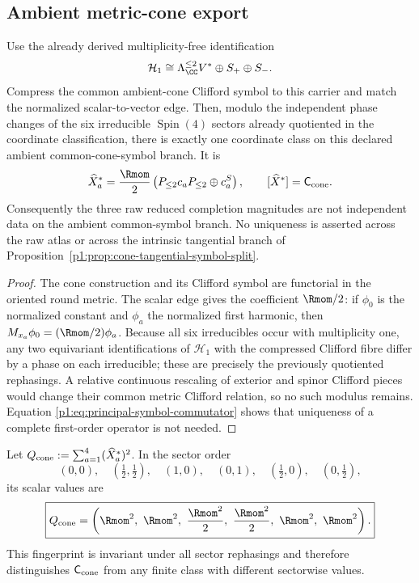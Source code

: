 \documentclass[11pt]{article}
\begin{document}
\subsection{Ambient metric-cone export}

\begin{theorem}
\label{p1:thm:metric-cone-clifford-coordinate-class}
\leavevmode\par
Use the already derived multiplicity-free identification
\[
 \mathcal H_1\cong
 \Lambda^{\le2}_{\CC}V^*\oplus S_+\oplus S_-.
\]
Compress the common ambient-cone Clifford symbol to this carrier and match the
normalized scalar-to-vector edge.  Then, modulo the independent phase changes
of the six irreducible $\operatorname{Spin}(4)$ sectors already quotiented in the coordinate
classification, there is exactly one coordinate class on this declared
ambient common-cone-symbol branch.  It is
\[
 \widehat X_a^*
 =\frac{\Rmom}{2}\left(P_{\le2}c_aP_{\le2}\oplus c_a^S\right),
 \qquad [\widehat X^*]=\mathsf C_{\rm cone}.
\]
Consequently the three raw reduced completion magnitudes are not independent
data on the ambient common-symbol branch.  No uniqueness is asserted across
the raw atlas or across the intrinsic tangential branch of
Proposition~\ref{p1:prop:cone-tangential-symbol-split}.
\end{theorem}

\begin{proof}
The cone construction and its Clifford symbol are functorial in the oriented
round metric.  The scalar edge gives the coefficient $\Rmom/2$: if $\phi_0$ is
the normalized constant and $\phi_a$ the normalized first harmonic, then
$M_{x_a}\phi_0=(\Rmom/2)\phi_a$.  Because all six irreducibles occur with
multiplicity one, any two equivariant identifications of $\mathcal H_1$ with
the compressed Clifford fibre differ by a phase on each irreducible; these are
precisely the previously quotiented rephasings.  A relative continuous
rescaling of exterior and spinor Clifford pieces would change their common
metric Clifford relation, so no such modulus remains.  Equation
\eqref{p1:eq:principal-symbol-commutator} shows that uniqueness of a complete
first-order operator is not needed.
\end{proof}

\begin{corollary}
\label{p1:cor:metric-cone-quadratic-fingerprint}
Let \(Q_{\rm cone}:=\sum_{a=1}^4(\widehat X_a^*)^2\).  In the sector order
\[
 (0,0),\quad(\tfrac12,\tfrac12),\quad(1,0),\quad(0,1),
 \quad(\tfrac12,0),\quad(0,\tfrac12),
\]
its scalar values are
\[
 \boxed{
 Q_{\rm cone}=
 \left(\Rmom^2,\ \Rmom^2,\ \frac{\Rmom^2}{2},\
       \frac{\Rmom^2}{2},\ \Rmom^2,\ \Rmom^2\right).}
\]
This fingerprint is invariant under all sector rephasings and therefore
distinguishes \(\mathsf C_{\rm cone}\) from any finite class with different
sectorwise values.
\end{corollary}
\end{document}
